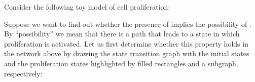 \documentclass[letterpaper,10pt,english]{sphinxmanual}
\begin{document}
Consider the following toy model of cell proliferation:

\begin{sphinxVerbatim}[commandchars=\\\{\}]
  \PYG{p}{[}
        
        \PYG{p}{]}
  
  
  
\end{sphinxVerbatim}

Suppose we want to find out whether the presence of  implies the possibility of .
By “possibility” we mean that there is a path that leads to a state in which proliferation is activated.
Let us first determine whether this property holds in the network above by drawing the state transition graph with
the initial states and the proliferation states highlighted by filled rectangles and a subgraph, respectively:
\end{document}

